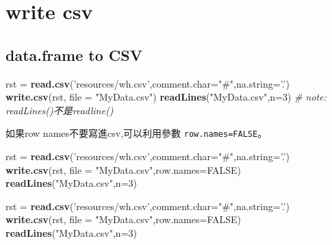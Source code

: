 \documentclass[]{book}
\newenvironment{Shaded}{\begin{snugshade}}{\end{snugshade}}
\newcommand{\CommentTok}[1]{\textcolor[rgb]{0.56,0.35,0.01}{\textit{#1}}}
\newcommand{\DataTypeTok}[1]{\textcolor[rgb]{0.13,0.29,0.53}{#1}}
\newcommand{\DecValTok}[1]{\textcolor[rgb]{0.00,0.00,0.81}{#1}}
\newcommand{\KeywordTok}[1]{\textcolor[rgb]{0.13,0.29,0.53}{\textbf{#1}}}
\newcommand{\NormalTok}[1]{#1}
\newcommand{\OtherTok}[1]{\textcolor[rgb]{0.56,0.35,0.01}{#1}}
\newcommand{\StringTok}[1]{\textcolor[rgb]{0.31,0.60,0.02}{#1}}
\theoremstyle{definition}
\theoremstyle{definition}
\theoremstyle{definition}
\theoremstyle{remark}
\begin{document}
\hypertarget{write-csv}{%
\section{write csv}\label{write-csv}}

\hypertarget{data.frame-to-csv}{%
\subsection{data.frame to CSV}\label{data.frame-to-csv}}

\begin{Shaded}
\begin{Highlighting}[]
\NormalTok{rst =}\StringTok{ }\KeywordTok{read.csv}\NormalTok{(}\StringTok{'resources/wh.csv'}\NormalTok{,}\DataTypeTok{comment.char=}\StringTok{"#"}\NormalTok{,}\DataTypeTok{na.string=}\StringTok{'.'}\NormalTok{)}
\KeywordTok{write.csv}\NormalTok{(rst, }\DataTypeTok{file =} \StringTok{"MyData.csv"}\NormalTok{)}
\KeywordTok{readLines}\NormalTok{(}\StringTok{"MyData.csv"}\NormalTok{,}\DataTypeTok{n=}\DecValTok{3}\NormalTok{) }\CommentTok{# note: readLines()不是readline() }
\end{Highlighting}
\end{Shaded}

如果row names不要寫進csv,可以利用參數 \texttt{row.names=FALSE}。

\begin{Shaded}
\begin{Highlighting}[]
\NormalTok{rst =}\StringTok{ }\KeywordTok{read.csv}\NormalTok{(}\StringTok{'resources/wh.csv'}\NormalTok{,}\DataTypeTok{comment.char=}\StringTok{"#"}\NormalTok{,}\DataTypeTok{na.string=}\StringTok{'.'}\NormalTok{)}
\KeywordTok{write.csv}\NormalTok{(rst, }\DataTypeTok{file =} \StringTok{"MyData.csv"}\NormalTok{,}\DataTypeTok{row.names=}\OtherTok{FALSE}\NormalTok{)}
\KeywordTok{readLines}\NormalTok{(}\StringTok{"MyData.csv"}\NormalTok{,}\DataTypeTok{n=}\DecValTok{3}\NormalTok{) }
\end{Highlighting}
\end{Shaded}

\begin{Shaded}
\begin{Highlighting}[]
\NormalTok{rst =}\StringTok{ }\KeywordTok{read.csv}\NormalTok{(}\StringTok{'resources/wh.csv'}\NormalTok{,}\DataTypeTok{comment.char=}\StringTok{"#"}\NormalTok{,}\DataTypeTok{na.string=}\StringTok{'.'}\NormalTok{)}
\KeywordTok{write.csv}\NormalTok{(rst, }\DataTypeTok{file =} \StringTok{"MyData.csv"}\NormalTok{,}\DataTypeTok{row.names=}\OtherTok{FALSE}\NormalTok{)}
\KeywordTok{readLines}\NormalTok{(}\StringTok{"MyData.csv"}\NormalTok{,}\DataTypeTok{n=}\DecValTok{3}\NormalTok{) }
\end{Highlighting}
\end{Shaded}
\end{document}
